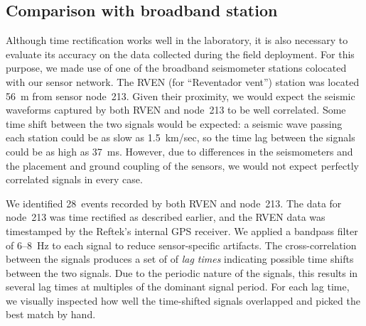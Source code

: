 

\subsection{Comparison with broadband station}
\label{evaluation-sec-datagroundtruthing}

Although time rectification works well in the laboratory, it is also
necessary to evaluate its accuracy on the data collected during the field
deployment. For this purpose, we made use of one of the broadband seismometer
stations colocated with our sensor network. The RVEN (for ``Reventador
vent'') station was located 56~m from sensor node~213.  Given their
proximity, we would expect the seismic waveforms captured by both RVEN and
node~213 to be well correlated.  Some time shift between the two signals
would be expected: a seismic wave passing each station could be as slow as
1.5~km/sec, so the time lag between the signals could be as high as 37~ms.
However, due to differences in the seismometers and the placement and ground
coupling of the sensors, we would not expect perfectly correlated signals in
every case.


We identified 28~events recorded by both RVEN and node~213.  The data for
node~213 was time rectified as described earlier, and the RVEN data was
timestamped by the Reftek's internal GPS receiver.  We applied a bandpass
filter of 6--8~Hz to each signal to reduce sensor-specific artifacts. The
cross-correlation between the signals produces a set of of {\em lag times}
indicating possible time shifts between the two signals.  Due to the periodic
nature of the signals, this results in several lag times at multiples of the
dominant signal period. For each lag time, we visually inspected how well the
time-shifted signals overlapped and picked the best match by hand.

